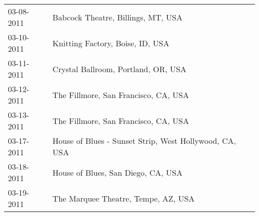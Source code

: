 \begin{supertabular}{ll}
 03-08-2011 &                      Babcock Theatre, Billings, MT, USA \\
 03-10-2011 &                        Knitting Factory, Boise, ID, USA \\
 03-11-2011 &                     Crystal Ballroom, Portland, OR, USA \\
 03-12-2011 &                    The Fillmore, San Francisco, CA, USA \\
 03-13-2011 &                    The Fillmore, San Francisco, CA, USA \\
 03-17-2011 &  House of Blues - Sunset Strip, West Hollywood, CA, USA \\
 03-18-2011 &                      House of Blues, San Diego, CA, USA \\
 03-19-2011 &                     The Marquee Theatre, Tempe, AZ, USA \\
\end{supertabular}
